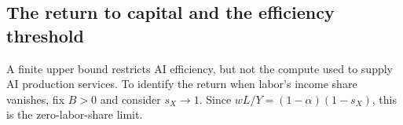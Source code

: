 
\subsection{The return to capital and the efficiency threshold}
\label{subsec:rewrite-return-threshold}

A finite upper bound restricts AI efficiency, but not the compute used to supply AI production services. To identify the return when labor's income share vanishes, fix $B>0$ and consider $s_X\to1$. Since $wL/Y=(1-\alpha)(1-s_X)$, this is the zero-labor-share limit.

